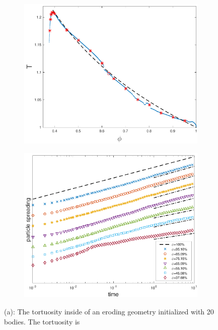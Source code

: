 \documentclass[preprint, 10pt]{elsarticle}
\begin{document}
\begin{figure}[H]
\begin{subfigure}[b]{0.5\textwidth}
\includegraphics*[height = 0.8\linewidth]{./figs/tort_eulerian}
\caption{}
\end{subfigure}
\begin{subfigure}[b]{0.5\textwidth}
\includegraphics*[height = 0.8\linewidth]{./figs/20b_second_moment_long_ref}
\caption{}
\end{subfigure}
\caption{\label{fig:Eroding20Transport} (a): The tortuosity inside of an
eroding geometry initialized with 20 bodies.  The tortuosity is
}
\end{figure}
\end{document}
